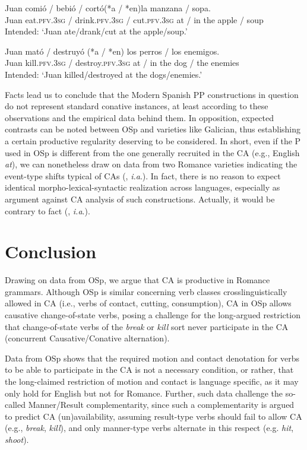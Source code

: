 \documentclass[output=paper,colorlinks,citecolor=brown,
]{langscibook}
\begin{document}
\ea
  \ea
    \gll Juan comió / bebió / cortó(*a / *en)la manzana / sopa.\\
Juan eat.\textsc{pfv}.\textsc{3sg} / drink.\textsc{pfv}.\textsc{3sg} / cut.\textsc{pfv}.\textsc{3sg} at / in the apple / soup\\
    \glt Intended: `Juan ate/drank/cut at the apple/soup.'
    
  \ex
    \gll Juan mató / destruyó (*a / *en) los perros / los enemigos.\\
Juan kill.\textsc{pfv}.\textsc{3sg} / destroy.\textsc{pfv}.\textsc{3sg} at / in the dog / the enemies\\
    \glt Intended: `Juan killed/destroyed at the dogs/enemies.'
  \z 
\z 

Facts lead us to conclude that the Modern Spanish PP constructions in question do not represent standard conative instances, at least according to these observations and the empirical data behind them. In opposition, expected contrasts can be noted between OSp and varieties like Galician, thus establishing a certain productive regularity deserving to be considered. In short, even if the P used in OSp is different from the one generally recruited in the CA (e.g., English \textit{at}), we can nonetheless draw on data from two Romance varieties indicating the event-type shifts typical of CAs (\citealt{vanHout1996}, \textit{i.a}.). In fact, there is no reason to expect identical morpho-lexical-syntactic realization across languages, especially as argument against CA analysis of such constructions. Actually, it would be contrary to fact (\citealt{Kiparsky1988}, \textit{i.a}.).

\section{Conclusion}\label{sec:mangialavori:6}
Drawing on data from OSp, we argue that CA is productive in Romance grammars. Although OSp is similar concerning verb classes crosslinguistically allowed in CA (i.e., verbs of contact, cutting, consumption), CA in OSp allows causative change-of-state verbs, posing a challenge for the long-argued restriction that change-of-state verbs of the \textit{break} or \textit{kill} sort never participate in the CA (concurrent Causative/Conative alternation). 

Data from OSp shows that the required motion and contact denotation for verbs to be able to participate in the CA is not a necessary condition, or rather, that the long-claimed restriction of motion and contact is language specific, as it may only hold for English but not for Romance. Further, such data challenge the so-called Manner/Result complementarity, since such a complementarity is argued to predict CA (un)availability, assuming result-type verbs should fail to allow CA (e.g., \textit{break}, \textit{kill}), and only manner-type verbs alternate in this respect (e.g. \textit{hit}, \textit{shoot}).
\end{document}
